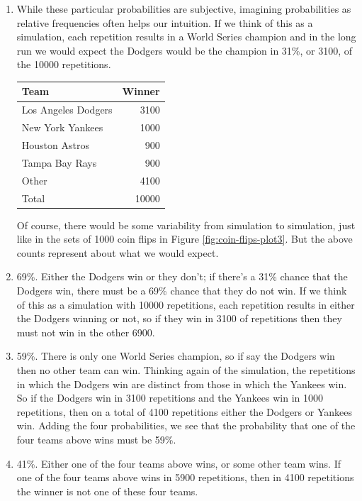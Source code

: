 \documentclass[
]{book}
\theoremstyle{definition}
\theoremstyle{definition}
\theoremstyle{definition}
\theoremstyle{remark}
\begin{document}
\begin{enumerate}
\def\labelenumi{\arabic{enumi}.}
\item
  While these particular probabilities are subjective, imagining probabilities as relative frequencies often helps our intuition. If we think of this as a simulation, each repetition results in a World Series champion and in the long run we would expect the Dodgers would be the champion in 31\%, or 3100, of the 10000 repetitions.

  \begin{longtable}[]{@{}lr@{}}
  \toprule
  Team & Winner\tabularnewline
  \midrule
  \endhead
  Los Angeles Dodgers & 3100\tabularnewline
  New York Yankees & 1000\tabularnewline
  Houston Astros & 900\tabularnewline
  Tampa Bay Rays & 900\tabularnewline
  Other & 4100\tabularnewline
  Total & 10000\tabularnewline
  \bottomrule
  \end{longtable}

  Of course, there would be some variability from simulation to simulation, just like in the sets of 1000 coin flips in Figure \ref{fig:coin-flips-plot3}. But the above counts represent about what we would expect.
\item
  69\%. Either the Dodgers win or they don't; if there's a 31\% chance that the Dodgers win, there must be a 69\% chance that they do not win. If we think of this as a simulation with 10000 repetitions, each repetition results in either the Dodgers winning or not, so if they win in 3100 of repetitions then they must not win in the other 6900.
\item
  59\%. There is only one World Series champion, so if say the Dodgers win then no other team can win. Thinking again of the simulation, the repetitions in which the Dodgers win are distinct from those in which the Yankees win. So if the Dodgers win in 3100 repetitions and the Yankees win in 1000 repetitions, then on a total of 4100 repetitions either the Dodgers or Yankees win. Adding the four probabilities, we see that the probability that one of the four teams above wins must be 59\%.
\item
  41\%. Either one of the four teams above wins, or some other team wins. If one of the four teams above wins in 5900 repetitions, then in 4100 repetitions the winner is not one of these four teams.
\end{enumerate}
\end{document}
